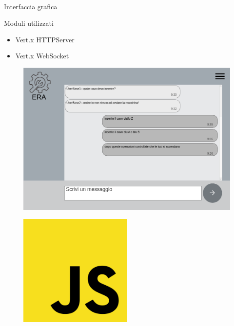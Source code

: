 	\subsection{}
		\begin{frame}{Interfaccia grafica}
			\begin{minipage}{0.4\textwidth}
				\begin{block}{Moduli utilizzati}
					\begin{itemize}
						\item Vert.x HTTPServer
						\item Vert.x WebSocket
					\end{itemize}
				\end{block}
			\end{minipage}
			\begin{minipage}{0.5\textwidth}
				\begin{figure}
					\includegraphics[width=1.2\textwidth]{capitolo_3/immagini/chat.png}
				\end{figure}
			\end{minipage}
			\begin{minipage}{0.3\textwidth}
				\begin{figure}
					\includegraphics[width=0.5\textwidth]{capitolo_3/immagini/js.png}

\end{figure}
\end{minipage}
\end{frame}
